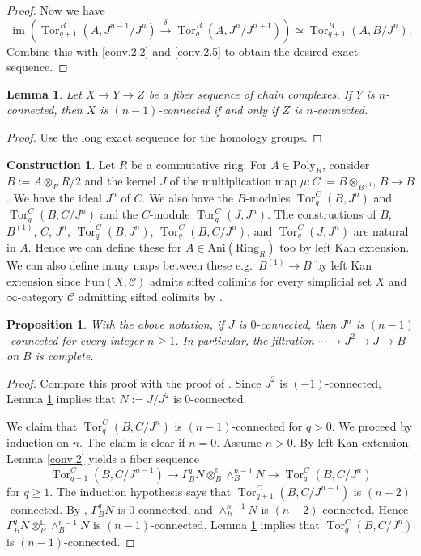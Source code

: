 \documentclass[10pt]{amsart}
\newtheorem{prop}[thm]{Proposition}
\newtheorem{lem}[thm]{Lemma}
\theoremstyle{definition}
\newtheorem{const}[thm]{Construction}
\numberwithin{equation}{section}
\renewcommand{\L}{\mathbb{L}}
\newcommand{\cC}{\mathcal{C}}
\DeclareMathOperator{\im}{im}
\newcommand{\Ani}{\mathrm{Ani}}
\newcommand{\Ring}{\mathrm{Ring}}
\newcommand{\Fun}{\mathrm{Fun}}
\newcommand{\Poly}{\mathrm{Poly}}
\DeclareMathOperator{\Tor}{\mathrm{Tor}}
\begin{document}
{\begin{proof}
Now we have
\[
\im (\Tor_{q+1}^B(A,J^{n-1}/J^n)\xrightarrow{\delta} \Tor_q^B(A,J^n/J^{n+1}))
\simeq
\Tor_{q+1}^B(A,B/J^n).
\]
Combine this with \eqref{conv.2.2} and \eqref{conv.2.5} to obtain the desired exact sequence.
\end{proof}

\begin{lem}
\label{conv.3}
Let $X\to Y\to Z$ be a fiber sequence of chain complexes.
If $Y$ is $n$-connected, then $X$ is $(n-1)$-connected if and only if $Z$ is $n$-connected.
\end{lem}
\begin{proof}
Use the long exact sequence for the homology groups.
\end{proof}

\begin{const}
\label{conv.5}
Let $R$ be a commutative ring.
For $A\in \Poly_R$,
consider $B:=A\otimes_R R/2$ and the kernel $J$ of the multiplication map $\mu\colon C:=B\otimes_{B^{(1)}}B\to B$.
We have the ideal $J^n$ of $C$.
We also have the $B$-modules
$\Tor_q^C(B,J^n)$ and $\Tor_q^C(B,C/J^n)$ and the $C$-module $\Tor_q^C(J,J^n)$.
The constructions of $B$, $B^{(1)}$, $C$, $J^n$, $\Tor_q^C(B,J^n)$, $\Tor_q^C(B,C/J^n)$, and $\Tor_q^C(J,J^n)$ are natural in $A$.
Hence we can define these for $A\in \Ani(\Ring_R)$ too by left Kan extension.
We can also define many maps between these e.g.\ $B^{(1)}\to B$ by left Kan extension since $\Fun(X,\cC)$ admits sifted colimits for every simplicial set $X$ and $\infty$-category $\cC$ admitting sifted colimits by \cite[Corollary 5.1.2.3]{HTT}.
\end{const}



\begin{prop}
\label{conv.4}
With the above notation,
if $J$ is $0$-connected,
then $J^n$ is $(n-1)$-connected for every integer $n\geq 1$.
In particular,
the filtration $\cdots \to J^2 \to J\to B$ on $B$ is complete.
\end{prop}
\begin{proof}
Compare this proof with the proof of \cite[Convergence theorem 8.8]{Qui}.
Since $J^2$ is $(-1)$-connected,
Lemma \ref{conv.3} implies that $N:=J/J^2$ is $0$-connected.

We claim that $\Tor_q^C(B,C/J^n)$ is $(n-1)$-connected for $q>0$.
We proceed by induction on $n$.
The claim is clear if $n=0$.
Assume $n>0$.
By left Kan extension,
Lemma \ref{conv.2} yields a fiber sequence
\[
\Tor_{q+1}^C(B,C/J^{n-1})
\to
\Gamma_B^q N \otimes_B^\L \wedge_B^{n-1} N
\to
\Tor_q^C(B,C/J^{n})
\]
for $q\geq 1$.
The induction hypothesis says that $\Tor_{q+1}^C(B,C/J^{n-1})$ is $(n-2)$-connected.
By \cite[Corollary 7.40]{Qui},
$\Gamma_B^q N$ is $0$-connected,
and $\wedge_B^{n-1}N$ is $(n-2)$-connected.
Hence $\Gamma_B^q N \otimes_B^\L \wedge_B^{n-1} N$ is $(n-1)$-connected.
Lemma \ref{conv.3} implies that $\Tor_q^C(B,C/J^n)$ is $(n-1)$-connected.


\end{proof}}
\end{document}
